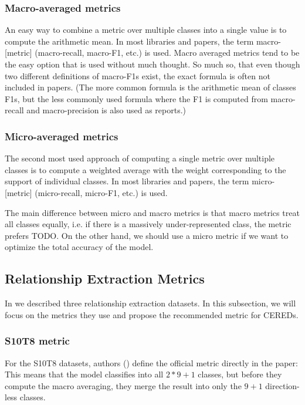 \subsubsection{Macro-averaged metrics}

An easy way to combine a metric over multiple classes into a single value is to compute the arithmetic mean. In most libraries and papers, the term macro-[metric] (macro-recall, macro-F1, etc.) is used.  Macro averaged metrics tend to be the easy option that is used without much thought. So much so, that even though two different definitions of macro-F1s exist, the exact formula is often not included in papers. (The more common formula is the arithmetic mean of classes F1s, but the less commonly used formula where the F1 is computed from macro-recall and macro-precision is also used as  \cite{Opitz2019MacroFA} reports.)

\subsubsection{Micro-averaged metrics}
The second most used approach of computing a single metric over multiple classes is to compute a weighted average with the weight corresponding to the support of individual classes. In most libraries and papers, the term micro-[metric] (micro-recall, micro-F1, etc.) is used. 

The main difference between micro and macro metrics is that macro metrics treat all classes equally, i.e. if there is a massively under-represented class, the metric prefers TODO. On the other hand, we should use a micro metric if we want to optimize the total accuracy of the model.

\subsection{Relationship Extraction Metrics}

In  we described three relationship extraction datasets. In this subsection, we will focus on the metrics they use and propose the recommended metric for CEREDs.

\subsubsection{S10T8 metric}
For the S10T8 datasets, authors (\cite{semeval}) define the official metric directly in the paper:  This means that the model classifies into all $2*9+1$ classes, but before they compute the macro averaging, they merge the result into only the $9+1$ direction-less classes.

